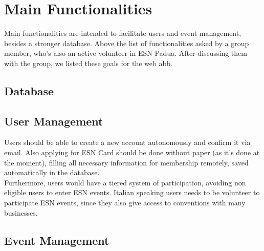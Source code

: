 \section{Main Functionalities}

Main functionalities are intended to facilitate users and event management, besides a stronger database.
Above the list of functionalities asked by a group member, who's also an active volunteer in ESN Padua.
After discussing them  with the group, we listed these goals for the web abb.

\subsection{Database}

\subsection{User Management}
Users should be able to create a new account autonomously and confirm it via email. Also
applying for ESN Card should be done without paper (as it's done at the moment), filling all necessary
information for membership remotely, saved automatically in the database.\\
Furthermore, users would have a tiered system of participation, avoiding non eligible users to enter ESN events. Italian
speaking users needs to be volunteer to participate ESN events, since they also give access to conventions with many businesses.\\

\subsection{Event Management}